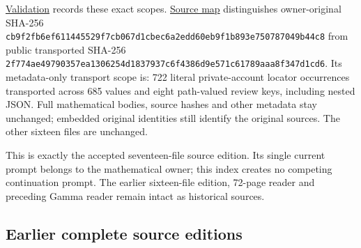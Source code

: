 \documentclass[
]{article}
\begin{document}
\href{https://github.com/KokunoYumeto/zeta-function-research-reader/blob/41adc412ceb119ad9086b1f106e377f3de2d401a/workbenches/splitzero-tandem/continuations/20260914-conductor-kernel-continuation/12_VALIDATION.md}{Validation}
records these exact scopes.
\href{https://github.com/KokunoYumeto/zeta-function-research-reader/blob/41adc412ceb119ad9086b1f106e377f3de2d401a/workbenches/splitzero-tandem/continuations/20260914-conductor-kernel-continuation/11_SOURCE_MAP.json}{Source
map} distinguishes owner-original SHA-256
\texttt{cb9f2fb6ef611445529f7cb067d1cbec6a2edd60eb9f1b893e750787049b44c8}
from public transported SHA-256
\texttt{2f774ae49790357ea1306254d1837937c6f4386d9e571c61789aaa8f347d1cd6}.
Its metadata-only transport scope is: 722 literal private-account
locator occurrences transported across 685 values and eight path-valued
review keys, including nested JSON. Full mathematical bodies, source
hashes and other metadata stay unchanged; embedded original identities
still identify the original sources. The other sixteen files are
unchanged.

This is exactly the accepted seventeen-file source edition. Its single
current prompt belongs to the mathematical owner; this index creates no
competing continuation prompt. The earlier sixteen-file edition, 72-page
reader and preceding Gamma reader remain intact as historical sources.

\subsection{Earlier complete source
editions}\label{earlier-complete-source-editions-3}
\end{document}
